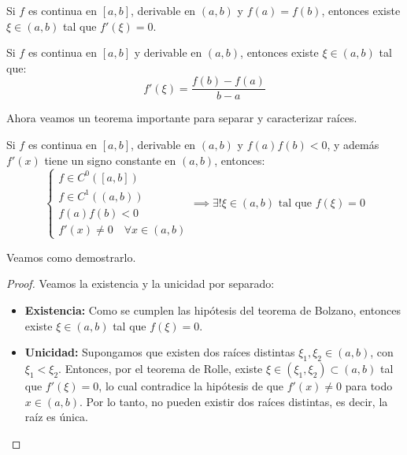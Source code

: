 \begin{teorema}
    Si $f$ es continua en $[a,b]$, derivable en $(a,b)$ y $f(a)=f(b)$, entonces existe $\xi \in (a,b)$ tal que $f'(\xi)=0$.
\end{teorema}

\begin{teorema}
    Si $f$ es continua en $[a,b]$ y derivable en $(a,b)$, entonces existe $\xi \in (a,b)$ tal que:
    \[
        f'(\xi) = \frac{f(b)-f(a)}{b-a}
    \]
\end{teorema}

Ahora veamos un teorema importante para separar y caracterizar raíces.

\begin{teorema}
    Si $f$ es continua en $[a,b]$, derivable en $(a,b)$ y $f(a)f(b)<0$, y además $f'(x)$ tiene un signo constante en $(a,b)$, entonces:
    \[
        \begin{cases}
            f\in C^0([a,b]) \\
            f\in C^1((a,b)) \\
            f(a)f(b)<0 \\
            f'(x) \neq 0 \quad \forall x \in (a,b)
        \end{cases}
        \implies
        \exists ! \xi \in (a,b) \text{ tal que } f(\xi)=0
    \]   
\end{teorema}

Veamos como demostrarlo.

\begin{proof}
    Veamos la existencia y la unicidad por separado:
    \begin{itemize}
        \item \textbf{Existencia: } Como se cumplen las hipótesis del teorema de Bolzano, entonces existe $\xi \in (a,b)$ tal que $f(\xi)=0$.
        \item \textbf{Unicidad: } Supongamos que existen dos raíces distintas $\xi_1, \xi_2 \in (a,b)$, con $\xi_1 < \xi_2$. Entonces, por el teorema de Rolle, existe $\xi \in (\xi_1, \xi_2) \subset (a,b)$ tal que $f'(\xi)=0$, lo cual contradice la hipótesis de que $f'(x) \neq 0$ para todo $x \in (a,b)$. Por lo tanto, no pueden existir dos raíces distintas, es decir, la raíz es única.
    \end{itemize}
\end{proof}

